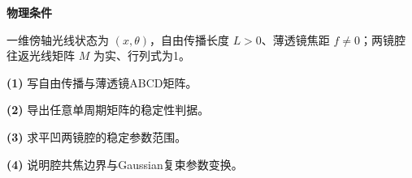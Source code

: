 \textbf{物理条件}\par 一维傍轴光线状态为 \((x,\theta)\)，自由传播长度 \(L>0\)、薄透镜焦距 \(f\ne0\)；两镜腔往返光线矩阵 \(M\) 为实、行列式为1。
\par\noindent\textbf{(1)} 写自由传播与薄透镜ABCD矩阵。
\par\noindent\textbf{(2)} 导出任意单周期矩阵的稳定性判据。
\par\noindent\textbf{(3)} 求平凹两镜腔的稳定参数范围。
\par\noindent\textbf{(4)} 说明腔共焦边界与Gaussian复束参数变换。
